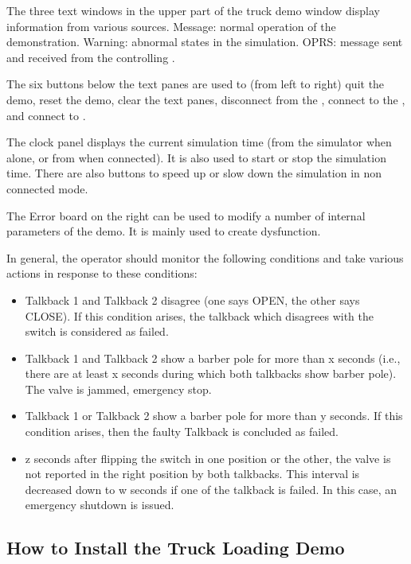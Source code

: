 The three text windows in the upper part of the truck demo window display
information from various sources. Message: normal operation of the
demonstration. Warning: abnormal states in the simulation. OPRS: message sent
and received from the controlling \CPK{}.

The six buttons below the text panes are used to (from left to right) quit the
demo, reset the demo, clear the text panes, disconnect from the \CPK{}, connect
to the \MP{}, and connect to \CPK{}.

The clock panel displays the current simulation time (from the simulator when
alone, or from \CPK{} when connected). It is also used to start or stop the
simulation time. There are also buttons to speed up or slow down the simulation
in non connected mode.

The Error board on the right can be used to modify a number of internal
parameters of the demo. It is mainly used to create dysfunction.

In general, the operator should monitor the following conditions and take
various actions in response to these conditions:

\begin{itemize}

\item Talkback 1 and Talkback 2 disagree (one says OPEN, the other says
CLOSE). If this condition arises, the talkback which disagrees with the switch
is considered as failed.

\item Talkback 1 and Talkback 2 show a barber pole for more than x seconds
(i.e., there are at least x seconds during which both talkbacks show
barber pole). The valve is jammed, emergency stop.

\item Talkback 1 or Talkback 2 show a barber pole for more than y seconds.
If this condition arises, then the faulty Talkback is concluded as failed.

\item z seconds after flipping the switch in one position or the other,
the valve is not reported in the right position by both talkbacks. This
interval is decreased down to w seconds if one of the talkback is failed. In
this case, an emergency shutdown is issued.

\end{itemize}

\subsection{How to Install the Truck Loading Demo}

